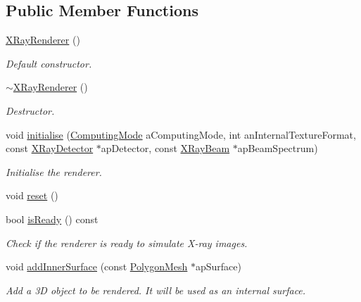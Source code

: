 \subsection*{Public Member Functions}
\begin{DoxyCompactItemize}
\item 
\hyperlink{classg_virtual_x_ray_1_1_x_ray_renderer_af946192494b2ccfbfa2cf0e5c4c04b30}{XRayRenderer} ()
\begin{DoxyCompactList}\small\item\em Default constructor. \end{DoxyCompactList}\item 
\hyperlink{classg_virtual_x_ray_1_1_x_ray_renderer_a713b38707c30dfcb0a60f7b0e9d22ba0}{$\sim$XRayRenderer} ()
\begin{DoxyCompactList}\small\item\em Destructor. \end{DoxyCompactList}\item 
void \hyperlink{classg_virtual_x_ray_1_1_x_ray_renderer_ad9bacedb45b8f2c89eb9ed25ca82e9fa}{initialise} (\hyperlink{classg_virtual_x_ray_1_1_x_ray_renderer_af306d3bab294f730af5a692f716c9f81}{ComputingMode} aComputingMode, int anInternalTextureFormat, const \hyperlink{classg_virtual_x_ray_1_1_x_ray_detector}{XRayDetector} $\ast$apDetector, const \hyperlink{classg_virtual_x_ray_1_1_x_ray_beam}{XRayBeam} $\ast$apBeamSpectrum)
\begin{DoxyCompactList}\small\item\em Initialise the renderer. \end{DoxyCompactList}\item 
void \hyperlink{classg_virtual_x_ray_1_1_x_ray_renderer_a4653f81b7f5fd198d82d9037caf132e5}{reset} ()
\item 
bool \hyperlink{classg_virtual_x_ray_1_1_x_ray_renderer_a5b8756ac0174d619b2c7daff536b846f}{isReady} () const 
\begin{DoxyCompactList}\small\item\em Check if the renderer is ready to simulate X-\/ray images. \end{DoxyCompactList}\item 
void \hyperlink{classg_virtual_x_ray_1_1_x_ray_renderer_a65a11e213cc087fbbf83b232901ca443}{addInnerSurface} (const \hyperlink{class_graphics_1_1_polygon_mesh}{PolygonMesh} $\ast$apSurface)
\begin{DoxyCompactList}\small\item\em Add a 3D object to be rendered. It will be used as an internal surface. \end{DoxyCompactList}\item 

\end{DoxyCompactItemize}

